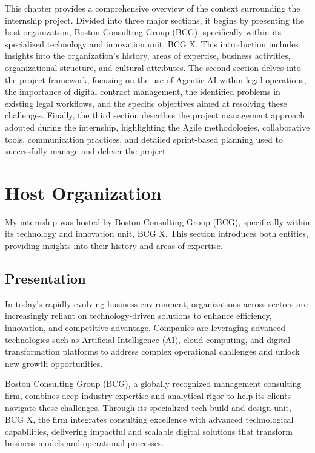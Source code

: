 This chapter provides a comprehensive overview of the context surrounding the internship project. Divided into three major sections, it begins by presenting the host organization, Boston Consulting Group (BCG), specifically within its specialized technology and innovation unit, BCG X. This introduction includes insights into the organization's history, areas of expertise, business activities, organizational structure, and cultural attributes. The second section delves into the project framework, focusing on the use of Agentic AI within legal operations, the importance of digital contract management, the identified problems in existing legal workflows, and the specific objectives aimed at resolving these challenges. Finally, the third section describes the project management approach adopted during the internship, highlighting the Agile methodologies, collaborative tools, communication practices, and detailed sprint-based planning used to successfully manage and deliver the project.\newpage
{}

\section{Host Organization}

My internship was hosted by Boston Consulting Group (BCG), specifically within its technology and innovation unit, BCG X. This section introduces both entities, providing insights into their history and areas of expertise.

\subsection{Presentation}
In today's rapidly evolving business environment, organizations across sectors are increasingly reliant on technology-driven solutions to enhance efficiency, innovation, and competitive advantage. Companies are leveraging advanced technologies such as Artificial Intelligence (AI), cloud computing, and digital transformation platforms to address complex operational challenges and unlock new growth opportunities.\mynewline

Boston Consulting Group (BCG), a globally recognized management consulting firm, combines deep industry expertise and analytical rigor to help its clients navigate these challenges. Through its specialized tech build and design unit, BCG X, the firm integrates consulting excellence with advanced technological capabilities, delivering impactful and scalable digital solutions that transform business models and operational processes.\mynewline

